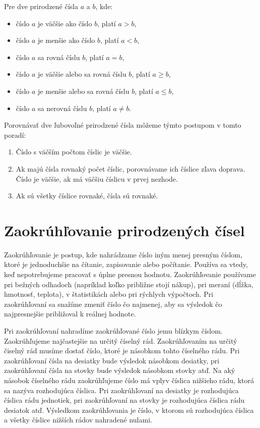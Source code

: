 \documentclass{article}
\begin{document}
Pre dve prirodzené čísla \(a\) a \(b\), kde:
\begin{itemize}
  \item číslo \(a\) je väčšie ako číslo \(b\), platí \(a > b\),
  \item číslo \(a\) je menšie ako číslo \(b\), platí \(a < b\),
  \item číslo \(a\) sa rovná číslu \(b\), platí \(a = b\),
  \item číslo \(a\) je väčšie alebo sa rovná číslu \(b\), platí \(a \geq b\),
  \item číslo \(a\) je menšie alebo sa rovná číslu \(b\), platí \(a \leq b\),
  \item číslo \(a\) sa nerovná číslu \(b\), platí \(a \neq b\).
\end{itemize}
Porovnávať dve ľubovoľné prirodzené čísla môžeme týmto postupom v tomto poradí:
\begin{enumerate}[label=\arabic*)]
  \item Číslo s väčším počtom číslic je väčšie.
  \item Ak majú čísla rovnaký počet číslic, porovnávame ich číslice zľava doprava. Číslo je väčšie, ak má väčšiu číslicu v prvej nezhode.
  \item Ak sú všetky číslice rovnaké, čísla sú rovnaké.
\end{enumerate}

\section{Zaokrúhľovanie prirodzených čísel}

Zaokrúhľovanie je postup, kde nahrádzame číslo iným menej presným číslom, ktoré je jednoduchšie na čítanie, zapisovanie alebo počítanie. Používa sa vtedy, keď nepotrebujeme pracovať s úplne presnou hodnotu. Zaokrúhľovanie používame pri bežných odhadoch (napríklad koľko približne stojí nákup), pri meraní (dĺžka, hmotnosť, teplota), v štatistikách alebo pri rýchlych výpočtoch. Pri zaokrúhľovaní sa snažíme zmeniť číslo čo najmenej, aby sa výsledok čo najpresnejšie približoval k reálnej hodnote.

Pri zaokrúhľovaní nahradíme zaokrúhľované číslo jemu blízkym číslom. Zaokrúhľujeme najčastejšie na určitý číselný rád. Zaokrúhľovaním na určitý čiselný rád musíme dostať číslo, ktoré je násobkom tohto číselného rádu. Pri zaokrúhľovaní čísla na desiatky bude výsledok násobkom desiatky, pri zaokrúhľovaní čísla na stovky bude výsledok násobkom stovky atď. Na aký násobok číselného rádu zaokrúhľujeme číslo má vplyv číslica nižšieho rádu, ktorá sa nazýva rozhodujúca číslica. Pri zaokrúhľovaní na desiatky je rozhodujúca číslica rádu jednotiek, pri zaokrúhľovaní na stovky je rozhodujúca číslica rádu desiatok atď. Výsledkom zaokrúhľovania je číslo, v ktorom sú rozhodujúca číslica a všetky číslice nižších rádov nahradené nulami.
\end{document}
